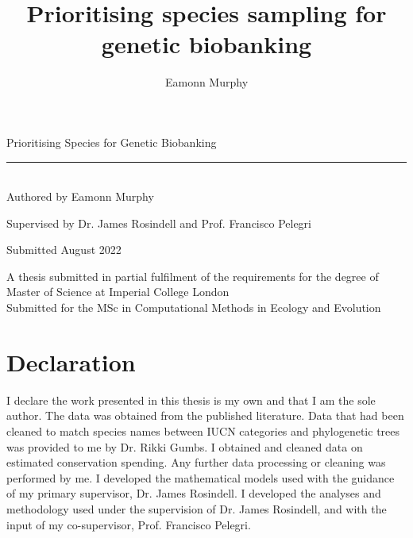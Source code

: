 \documentclass[12pt]{article}
\title{Prioritising species sampling for genetic biobanking}
\author{Eamonn Murphy}
\begin{document}
	\begin{titlepage}
		\newcommand{\HRule}{\rule{\linewidth}{0.6mm}}
		\begin{center}
			\vspace{\baselineskip}
			\huge
			Prioritising Species for Genetic Biobanking
			
			\HRule \\
			\large
			\vspace{5ex}
			Authored by Eamonn Murphy
			
			\medspace
			
			Supervised by Dr. James Rosindell and Prof. Francisco Pelegri
			
			\vspace*{\fill}
			
			Submitted August 2022
			
			\vspace*{\fill}
			\normalsize
			A thesis submitted in partial fulfilment of the requirements for the degree of
			Master of Science at Imperial College London
			\vspace{2ex} \\
			Submitted for the MSc in Computational Methods in Ecology and Evolution
	\end{center}

	\end{titlepage}
	
	\pagebreak
	
	\section{Declaration}
	I declare the work presented in this thesis is my own and that I am the
	sole author. The data was obtained from the published literature. Data that
	had been cleaned to match species names between IUCN categories and
	phylogenetic trees
	was provided to me by Dr. Rikki Gumbs. I obtained and cleaned data on estimated
	conservation spending. Any further data processing or cleaning was performed
	by me. I developed the mathematical models used with the
	guidance of my primary supervisor, Dr. James Rosindell. I developed the analyses
	and methodology used under the supervision of Dr. James Rosindell, and with
	the input of my co-supervisor, Prof. Francisco Pelegri.
	
	\pagebreak
	
\end{document}
